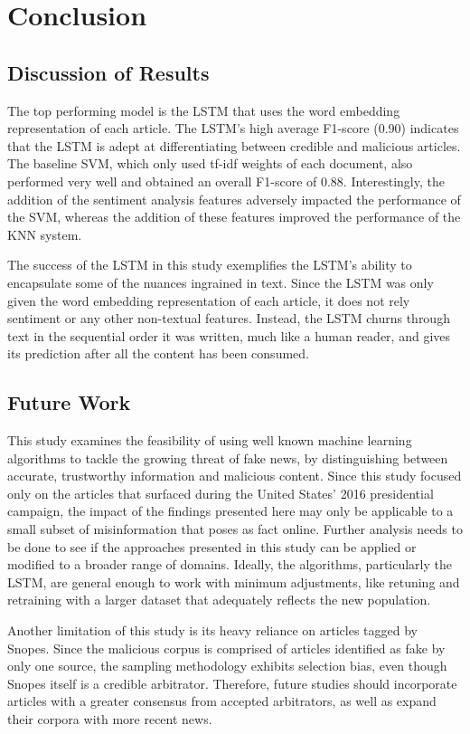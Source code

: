 \chapter{Conclusion}

\section{Discussion of Results}

The top performing model is the LSTM that uses the word embedding representation of each article.  The LSTM's high average F1-score (0.90) indicates that the LSTM is adept at differentiating between credible and malicious articles.  The baseline SVM, which only used tf-idf weights of each document, also performed very well and obtained an overall F1-score of 0.88.  Interestingly, the addition of the sentiment analysis features adversely impacted the performance of the SVM, whereas the addition of these features improved the performance of the KNN system.

The success of the LSTM in this study exemplifies the LSTM's ability to encapsulate some of the nuances ingrained in text.  Since the LSTM was only given the word embedding representation of each article, it does not rely sentiment or any other non-textual features.  Instead, the LSTM churns through text in the sequential order it was written, much like a human reader, and gives its prediction after all the content has been consumed.


\section{Future Work}

This study examines the feasibility of using well known machine learning algorithms to tackle the growing threat of fake news, by distinguishing between accurate, trustworthy information and malicious content.  Since this study focused only on the articles that surfaced during the United States' 2016 presidential campaign, the impact of the findings presented here may only be applicable to a small subset of misinformation that poses as fact online.  Further analysis needs to be done to see if the approaches presented in this study can be applied or modified to a broader range of domains.  Ideally, the algorithms, particularly the LSTM, are general enough to work with minimum adjustments, like retuning and retraining with a larger dataset that adequately reflects the new population.

Another limitation of this study is its heavy reliance on articles tagged by Snopes.  Since the malicious corpus is comprised of articles identified as fake by only one source, the sampling methodology exhibits selection bias, even though Snopes itself is a credible arbitrator.  Therefore, future studies should incorporate articles with a greater consensus from accepted arbitrators, as well as expand their corpora with more recent news.

